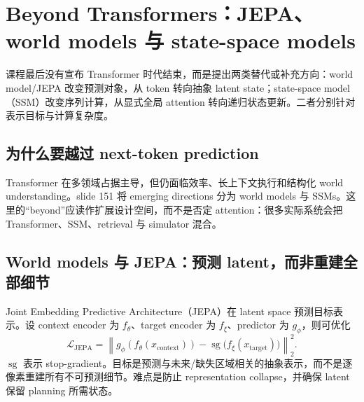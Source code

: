 \section{Beyond Transformers：JEPA、world models 与 state-space models}

课程最后没有宣布 Transformer 时代结束，而是提出两类替代或补充方向：world model/JEPA 改变预测对象，从 token 转向抽象 latent state；state-space model（SSM）改变序列计算，从显式全局 attention 转向递归状态更新。二者分别针对表示目标与计算复杂度。

\subsection{为什么要越过 next-token prediction}

Transformer 在多领域占据主导，但仍面临效率、长上下文执行和结构化 world understanding。slide 151 将 emerging directions 分为 world models 与 SSMs。这里的“beyond”应读作扩展设计空间，而不是否定 attention：很多实际系统会把 Transformer、SSM、retrieval 与 simulator 混合。



\subsection{World models 与 JEPA：预测 latent，而非重建全部细节}

Joint Embedding Predictive Architecture（JEPA）在 latent space 预测目标表示。设 context encoder 为 $f_{\theta}$、target encoder 为 $f_{\xi}$、predictor 为 $g_{\phi}$，则可优化
\[
\mathcal{L}_{\mathrm{JEPA}}
=\left\|g_{\phi}(f_{\theta}(x_{\mathrm{context}}))-\operatorname{sg}\big(f_{\xi}(x_{\mathrm{target}})\big)\right\|_2^2.
\]
$\operatorname{sg}$ 表示 stop-gradient。目标是预测与未来/缺失区域相关的抽象表示，而不是逐像素重建所有不可预测细节。难点是防止 representation collapse，并确保 latent 保留 planning 所需状态。



